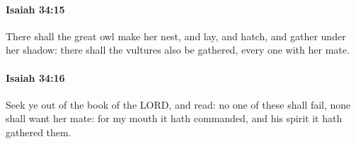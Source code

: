 		\paragraph{Isaiah 34:15} %
			\label{ISAIAH-34-15}

			There shall the great owl make her nest, and lay, and hatch, and gather under her shadow: there shall the vultures also be gathered, every one with her mate.


		\paragraph{Isaiah 34:16} %
			\label{ISAIAH-34-16}

			Seek ye out of the book of the LORD, and read: no one of these shall fail, none shall want her mate: for my mouth it hath commanded, and his spirit it hath gathered them.


